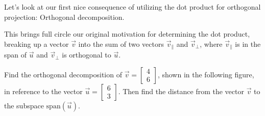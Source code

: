 \documentclass{ximera}
\begin{document}
\begin{exploration}
   Let's look at our first nice consequence of utilizing the dot product for orthogonal projection: Orthogonal decomposition.

   This brings full circle our original motivation for determining the dot product, breaking up a vector $\vec{v}$ into the sum of two vectors $\vec{v}_\parallel$ and $\vec{v}_\perp$, where $\vec{v}_\parallel$ is in the span of $\vec{u}$ and $\vec{v}_\perp$ is orthogonal to $\vec{u}$.

   \begin{example}\label{ex:projection1}
      Find the orthogonal decomposition of $\vec{v}=\begin{bmatrix}
      4\\6
      \end{bmatrix}$, shown in the following figure, in reference to the vector $\vec{u}=\begin{bmatrix}
         6\\3
      \end{bmatrix}$. Then find the distance from the vector $\vec{v}$ to the subspace $\mbox{span}(\vec{u})$.
       
      \begin{center}
      \end{center}
       

\end{example}
\end{exploration}
\end{document}
